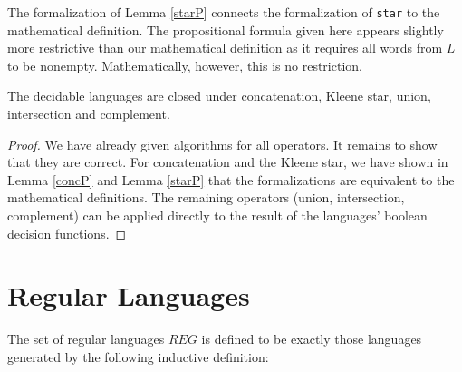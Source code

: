     
    The formalization of Lemma \ref{starP} connects the formalization of \lstinline{star} to the mathematical definition. The propositional formula given here appears slightly more restrictive than our mathematical definition as it requires all words from $L$ to be nonempty. 
    Mathematically, however, this is no restriction. 
    


    \begin{theorem}{}
        \label{DecLangClosed}
        The decidable languages are closed under concatenation, Kleene star, union, intersection and complement. 
    \end{theorem}
    \begin{proof}
        We have already given algorithms for all operators. 
        It remains to show that they are correct.
        For concatenation and the Kleene star, we have shown in Lemma \ref{concP} and Lemma \ref{starP} that the formalizations are equivalent to the mathematical definitions. 
        The remaining operators (union, intersection, complement) can be applied directly to the result of the languages' boolean decision functions.
    \end{proof}

    


    \section{Regular Languages}


    \begin{definition}{}
        \label{REG}
        The set of regular languages $REG$ is defined to be exactly those languages generated by the following inductive definition:
        
    \end{definition}


